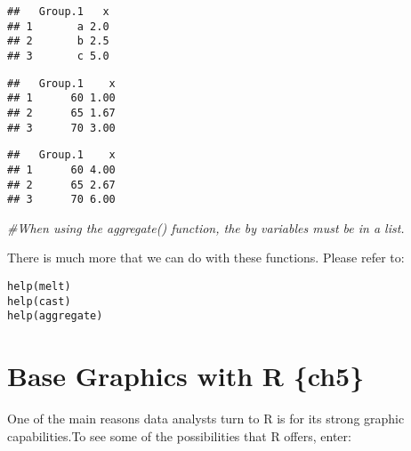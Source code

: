 \documentclass[]{book}
\newenvironment{Shaded}{\begin{snugshade}}{\end{snugshade}}
\newcommand{\KeywordTok}[1]{\textcolor[rgb]{0.13,0.29,0.53}{\textbf{#1}}}
\newcommand{\DataTypeTok}[1]{\textcolor[rgb]{0.13,0.29,0.53}{#1}}
\newcommand{\CommentTok}[1]{\textcolor[rgb]{0.56,0.35,0.01}{\textit{#1}}}
\newcommand{\OperatorTok}[1]{\textcolor[rgb]{0.81,0.36,0.00}{\textbf{#1}}}
\newcommand{\NormalTok}[1]{#1}
\theoremstyle{definition}
\theoremstyle{definition}
\theoremstyle{definition}
\theoremstyle{remark}
\begin{document}
\begin{verbatim}
##   Group.1   x
## 1       a 2.0
## 2       b 2.5
## 3       c 5.0
\end{verbatim}

\begin{Shaded}
\end{Shaded}

\begin{verbatim}
##   Group.1    x
## 1      60 1.00
## 2      65 1.67
## 3      70 3.00
\end{verbatim}

\begin{Shaded}
\end{Shaded}

\begin{verbatim}
##   Group.1    x
## 1      60 4.00
## 2      65 2.67
## 3      70 6.00
\end{verbatim}

\begin{Shaded}
\begin{Highlighting}[]
\CommentTok{#When using the aggregate() function, the by variables must be in a list. }
\end{Highlighting}
\end{Shaded}

There is much more that we can do with these functions. Please refer to:

\begin{verbatim}
help(melt)
help(cast)
help(aggregate)
\end{verbatim}

\chapter{Base Graphics with R \{ch5\}}\label{base-graphics-with-r-ch5}

One of the main reasons data analysts turn to R is for its strong
graphic capabilities.To see some of the possibilities that R offers,
enter:
\end{document}
